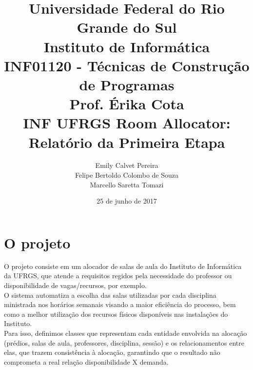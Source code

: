 \documentclass[a4paper]{article}
\title{Universidade Federal do Rio Grande do Sul \\
	   Instituto de Informática \\
       INF01120 - Técnicas de Construção de Programas \\
       Prof. Érika Cota \\
       INF UFRGS Room Allocator: Relatório da Primeira Etapa}
\author{Emily Calvet Pereira \\
        Felipe Bertoldo Colombo de Souza \\
        Marcello Saretta Tomazi}
\date{25 de junho de 2017}
\begin{document}
\maketitle
\newpage


\section{O projeto}
 O projeto consiste em um alocador de salas de aula do Instituto de Informática da UFRGS, que atende a requisitos regidos pela necessidade do professor ou disponibilidade de vagas/recursos, por exemplo.
	\\	O sistema automatiza a escolha das salas utilizadas por cada disciplina ministrada nos horários semanais visando a maior eficiência do processo, bem como a melhor utilização dos recursos físicos disponíveis nas instalações do Instituto.
	\\	Para isso, definimos classes que representam cada entidade envolvida na alocação (prédios, salas de aula, professores, disciplina, sessão) e os relacionamentos entre elas, que trazem consistência à alocação, garantindo que o resultado não comprometa a real relação disponibilidade X demanda.
\end{document}
